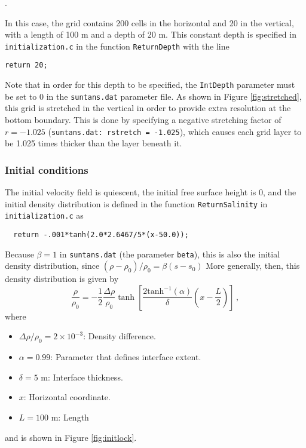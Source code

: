 \medskip
\noindent
\mfiledownload.

\medskip
\noindent
In this case, the grid contains 200 cells in the horizontal and 20 in the vertical, with
a length of 100 m and a depth of 20 m.  This constant depth is specified in \verb+initialization.c+
in the function \verb+ReturnDepth+ with the line
\begin{verbatim}
return 20;
\end{verbatim}
Note that in order for this depth to be specified, the \verb+IntDepth+ parameter must
be set to 0 in the \verb+suntans.dat+ parameter file.  As shown in Figure \ref{fig:stretched},
this grid is stretched in the
vertical in order to provide extra resolution at the bottom boundary.  This is done by
specifying a negative stretching factor of $r=-1.025$ (\verb+suntans.dat: rstretch = -1.025+),
which causes each grid layer to be 1.025 times thicker than the layer beneath it.  

\subsubsection{Initial conditions}

The initial velocity field is quiescent, the initial free surface height is 0,
and the initial density distribution is defined in the function \verb+ReturnSalinity+
in \verb+initialization.c+ as
\begin{verbatim}
  return -.001*tanh(2.0*2.6467/5*(x-50.0));
\end{verbatim}
Because $\beta=1$ in \verb+suntans.dat+ (the parameter \verb+beta+), this is also the initial density 
distribution, since $(\rho-\rho_0)/\rho_0 = \beta(s-s_0)$ More generally, then, 
this density distribution is given by
\[
\frac{\rho}{\rho_0} = -\frac{1}{2}\frac{\Delta\rho}{\rho_0}
\tanh\left[\frac{2\mbox{tanh}^{-1}(\alpha)}{\delta}\left(x-\frac{L}{2}\right)\right]\,,
\]
where
\begin{itemize}
\item $\Delta\rho/\rho_0=2\times 10^{-3}$: Density difference.
\item $\alpha=0.99$: Parameter that defines interface extent.
\item $\delta=5$ m: Interface thickness.
\item $x$: Horizontal coordinate.
\item $L=100$ m: Length
\end{itemize}
and is shown in Figure \ref{fig:initlock}. 

